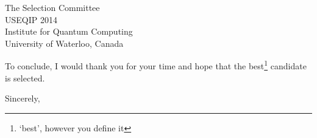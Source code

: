 \documentclass{letter}
\begin{document}
\begin{letter}{The Selection Committee\\USEQIP 2014\\Institute for Quantum Computing\\University of Waterloo, Canada}
\begin{enumerate}





\end{enumerate}


To conclude, I would thank you for your time and hope that the best\footnote{`best', however you define it} candidate is selected.


\vspace{2\parskip} %
\closing{Sincerely,}
\vspace{2\parskip} %




\end{letter}
 
\end{document}
